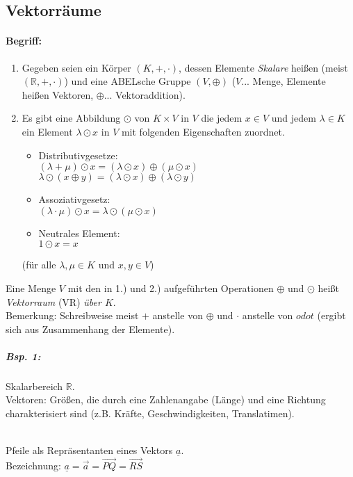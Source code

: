 \subsection{Vektorräume}

\paragraph{Begriff:}
\begin{enumerate}
\item Gegeben seien ein Körper $(K,+,\cdot)$, dessen Elemente \emph{Skalare} heißen (meist $(\mathbb{R}, + ,\cdot)$) und eine ABELsche Gruppe $(V,\oplus)$ ($V$... Menge, Elemente heißen Vektoren, $\oplus$... Vektoraddition).
\item Es gibt eine Abbildung $\odot$ von $K\times V$ in $V$ die jedem $x \in V$ und jedem $\lambda \in K$ ein Element $\lambda \odot x$ in $V$ mit folgenden Eigenschaften zuordnet.
\begin{itemize}
\item Distributivgesetze: \\
$(\lambda + \mu)\odot x = (\lambda \odot x) \oplus (\mu \odot x)$\\
$\lambda\odot(x\oplus y)=(\lambda \odot x) \oplus (\lambda \odot y)$
\item Assoziativgesetz:\\
$(\lambda \cdot \mu ) \odot x = \lambda \odot (\mu \odot x)$
\item Neutrales Element:\\
$1 \odot x = x $
\end{itemize}
(für alle $\lambda, \mu \in K$ und $x,y\in V$)
\end{enumerate}
Eine Menge $V$ mit den in 1.) und 2.) aufgeführten Operationen $\oplus$ und $\odot$ heißt \emph{Vektorraum} (VR) \emph{über $K$}.\\
Bemerkung: Schreibweise meist $+$ anstelle von $\oplus$ und $\cdot$ anstelle von $odot$ (ergibt sich aus Zusammenhang der Elemente).
\subparagraph{Bsp. 1:} \parskp
Skalarbereich $\mathbb{R}$.\\
Vektoren: Größen, die durch eine Zahlenangabe (Länge) und eine Richtung charakterisiert sind (z.B. Kräfte, Geschwindigkeiten, Translatimen).\\
\\
Pfeile als Repräsentanten eines Vektors $\underline{a}$.\\
Bezeichnung: $\underline{a}=\overrightarrow{a}=\overrightarrow{PQ}=\overrightarrow{RS}$

